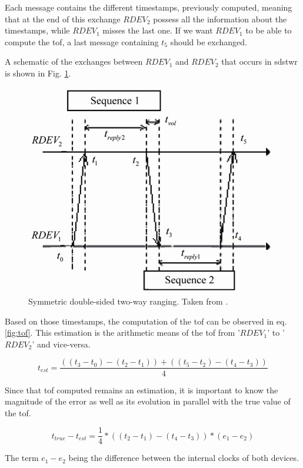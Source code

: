 Each message contains the different timestamps, previously computed, meaning that at the end of this exchange $RDEV_2$ possess all the information about the timestamps, while $RDEV_1$ misses the last one. If we want $RDEV_1$ to be able to compute the \gls{tof}, a last message containing $t_5$ should be exchanged.
\vspace{2mm}

A schematic of the exchanges between $RDEV_1$ and $RDEV_2$ that occurs in \gls{sdstwr} is shown in Fig. \ref{sdstwr}. 

\begin{figure}[H]
\centering
\includegraphics[width=.6\linewidth]{Images/sds-twr.png}
\caption{Symmetric double-sided two-way ranging. Taken from \cite{dalce2011comparison}.}
\label{sdstwr}
\end{figure}

Based on those timestamps, the computation of the \gls{tof} can be observed in eq. \ref{fig:tof}. This estimation is the arithmetic means of the \gls{tof} from '$RDEV_1$' to '$RDEV_2$' and vice-versa.

\begin{equation}
	t_{est} = \frac{((t_3 - t_0) - (t_2 - t_1)) + ((t_5 - t_2) - (t_4 - t_3))}{4}
\label{fig:tof}
\end{equation}

Since that \gls{tof} computed remains an estimation, it is important to know the magnitude of the error as well as its evolution in parallel with the true value of the \gls{tof}.

\begin{equation}
	t_{true} - t_{est} = \frac{1}{4}*((t_2 - t_1) - (t_4 - t_3))*(e_1 - e_2)
\end{equation}

The term $e_1 - e_2$ being the difference between the internal clocks of both devices. \cite{dalce2011comparison}


